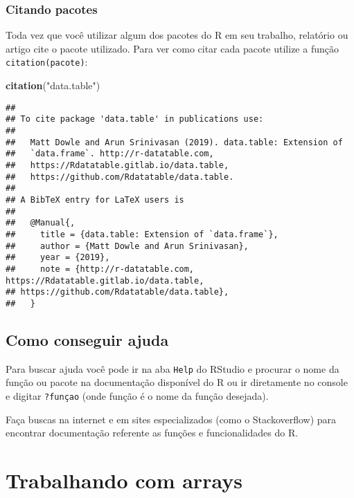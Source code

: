 \documentclass[]{book}
\newenvironment{Shaded}{\begin{snugshade}}{\end{snugshade}}
\newcommand{\KeywordTok}[1]{\textcolor[rgb]{0.13,0.29,0.53}{\textbf{#1}}}
\newcommand{\NormalTok}[1]{#1}
\newcommand{\StringTok}[1]{\textcolor[rgb]{0.31,0.60,0.02}{#1}}
\theoremstyle{definition}
\theoremstyle{definition}
\theoremstyle{definition}
\theoremstyle{remark}
\begin{document}
\hypertarget{citando-pacotes}{%
\subsection{Citando pacotes}\label{citando-pacotes}}

Toda vez que você utilizar algum dos pacotes do R em seu trabalho, relatório ou artigo cite o pacote utilizado. Para ver como citar cada pacote utilize a função \texttt{citation(pacote)}:

\begin{Shaded}
\begin{Highlighting}[]
\KeywordTok{citation}\NormalTok{(}\StringTok{"data.table"}\NormalTok{)}
\end{Highlighting}
\end{Shaded}

\begin{verbatim}
## 
## To cite package 'data.table' in publications use:
## 
##   Matt Dowle and Arun Srinivasan (2019). data.table: Extension of
##   `data.frame`. http://r-datatable.com,
##   https://Rdatatable.gitlab.io/data.table,
##   https://github.com/Rdatatable/data.table.
## 
## A BibTeX entry for LaTeX users is
## 
##   @Manual{,
##     title = {data.table: Extension of `data.frame`},
##     author = {Matt Dowle and Arun Srinivasan},
##     year = {2019},
##     note = {http://r-datatable.com, https://Rdatatable.gitlab.io/data.table,
## https://github.com/Rdatatable/data.table},
##   }
\end{verbatim}

\hypertarget{como-conseguir-ajuda}{%
\section{Como conseguir ajuda}\label{como-conseguir-ajuda}}

Para buscar ajuda você pode ir na aba \texttt{Help} do RStudio e procurar o nome da função ou pacote na documentação disponível do R ou ir diretamente no console e digitar \texttt{?funçao} (onde função é o nome da função desejada).

Faça buscas na internet e em sites especializados (como o Stackoverflow) para encontrar documentação referente as funções e funcionalidades do R.

\hypertarget{arrays}{%
\chapter{Trabalhando com arrays}\label{arrays}}
\end{document}
